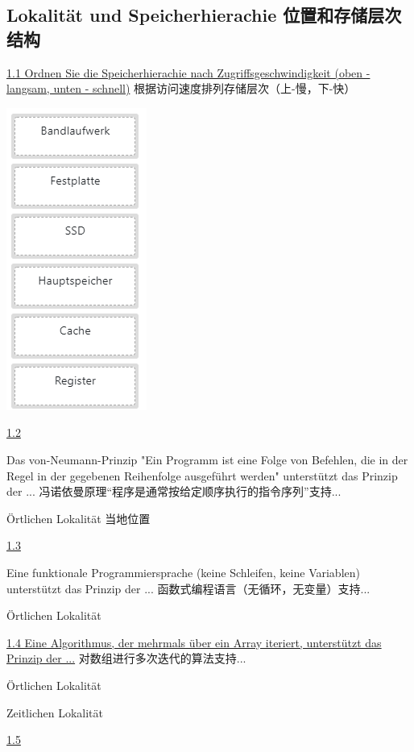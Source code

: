 \documentclass[fleqn]{article}
\begin{document}
\subsection{Lokalität und Speicherhierachie 位置和存储层次结构}

\noindent\uline{1.1	Ordnen Sie die Speicherhierachie nach Zugriffsgeschwindigkeit (oben - langsam, unten - schnell)}
根据访问速度排列存储层次（上-慢，下-快）

\begin{center}
    \includegraphics{24.png}
\end{center}

\noindent\uline{1.2}

\noindent Das von-Neumann-Prinzip "Ein Programm ist eine Folge von Befehlen, die in der Regel in der gegebenen Reihenfolge ausgeführt werden" unterstützt das Prinzip der ...
冯诺依曼原理“程序是通常按给定顺序执行的指令序列”支持...

Örtlichen Lokalität 当地位置

\noindent\uline{1.3}

\noindent Eine funktionale Programmiersprache (keine Schleifen, keine Variablen) unterstützt das Prinzip der ...
函数式编程语言（无循环，无变量）支持...

Örtlichen Lokalität

\noindent\uline{1.4 Eine Algorithmus, der mehrmals über ein Array iteriert, unterstützt das Prinzip der ...}
对数组进行多次迭代的算法支持...

Örtlichen Lokalität

Zeitlichen Lokalität

\noindent\uline{1.5}
\end{document}
